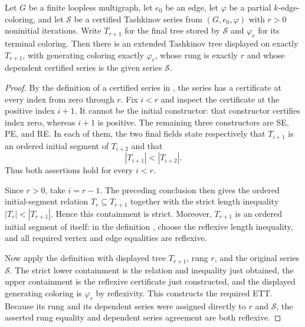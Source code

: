 \begin{lemma}
Let \(G\) be a finite loopless multigraph, let \(e_0\) be an edge, let
\(\varphi\) be a partial \(k\)-edge-coloring, and let \(\mathcal S\) be a
certified Tashkinov series from \((G,e_0,\varphi)\) with \(r>0\)
noninitial iterations.  Write \(T_{r+1}\) for the final tree stored by
\(\mathcal S\) and \(\varphi_r\) for its terminal coloring.  Then there is
an extended Tashkinov tree displayed on exactly \(T_{r+1}\), with generating
coloring exactly \(\varphi_r\), whose rung is exactly \(r\) and whose
dependent certified series is the given series \(\mathcal S\).
\end{lemma}
\begin{proof}
By the definition of a certified series in , the
series has a  certificate at every index from
zero through \(r\).  Fix \(i<r\) and inspect the certificate at the positive
index \(i+1\).  It cannot be the initial constructor: that constructor
certifies index zero, whereas \(i+1\) is positive.  The remaining three
constructors are SE, PE, and RE.  In each of them, the two final fields state
respectively that \(T_{i+1}\) is an ordered initial segment of
\(T_{i+2}\) and that
\[
                         |T_{i+1}|<|T_{i+2}|.
\]
Thus both assertions hold for every \(i<r\).

Since \(r>0\), take \(i=r-1\).  The preceding conclusion then gives the
ordered initial-segment relation
\(T_r\subseteq T_{r+1}\) together with the strict length inequality
\(|T_r|<|T_{r+1}|\).  Hence this containment is strict.  Moreover,
\(T_{r+1}\) is an ordered initial segment of itself: in the definition
, choose the reflexive length inequality,
and all required vertex and edge equalities are reflexive.

Now apply the definition  with displayed tree
\(T_{r+1}\), rung \(r\), and the original series \(\mathcal S\).  The strict
lower containment is the relation and inequality just obtained, the upper
containment is the reflexive certificate just constructed, and the displayed
generating coloring is \(\varphi_r\) by reflexivity.  This constructs the
required ETT.  Because its rung and its dependent series were assigned
directly to \(r\) and \(\mathcal S\), the asserted rung equality and dependent
series agreement are both reflexive.
\end{proof}
